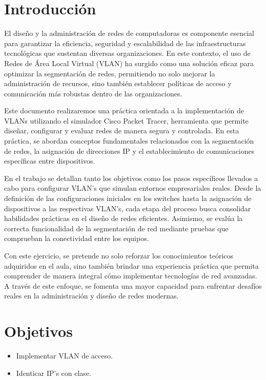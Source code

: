 \setcounter{page}{1}


\section{Introducción}
    El diseño y la administración de redes de computadoras es componente esencial para garantizar la eficiencia, seguridad y escalabilidad de las infraestructuras tecnológicas que sustentan diversas organizaciones. En este contexto, el uso de Redes de Área Local Virtual (VLAN) ha surgido como una solución eficaz para optimizar la segmentación de redes, permitiendo no solo mejorar la administración de recursos, sino también establecer políticas de acceso y comunicación más robustas dentro de las organizaciones.

    Este documento realizaremos una práctica orientada a la implementación de VLANs utilizando el simulador Cisco Packet Tracer, herramienta que permite diseñar, configurar y evaluar redes de manera segura y controlada. En esta práctica, se abordan conceptos fundamentales relacionados con la segmentación de redes, la asignación de direcciones IP y el establecimiento de comunicaciones específicas entre dispositivos.

    En el trabajo se detallan tanto los objetivos como los pasos específicos llevados a cabo para configurar VLAN's que simulan entornos empresariales reales. Desde la definición de las configuraciones iniciales en los switches hasta la asignación de dispositivos a las respectivas VLAN's, cada etapa del proceso busca consolidar habilidades prácticas en el diseño de redes eficientes. Asimismo, se evalúa la correcta funcionalidad de la segmentación de red mediante pruebas que comprueban la conectividad entre los equipos.

    Con este ejercicio, se pretende no solo reforzar los conocimientos teóricos adquiridos en el aula, sino también brindar una experiencia práctica que permita comprender de manera integral cómo implementar tecnologías de red avanzadas. A través de este enfoque, se fomenta una mayor capacidad para enfrentar desafíos reales en la administración y diseño de redes modernas.

\section{Objetivos}
    \begin{itemize}
        \item Implementar VLAN de acceso.
        \item Identicar IP's con clase.
    \end{itemize}

